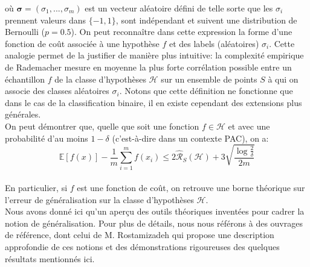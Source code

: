 où $\mathbf{\sigma} = (\sigma_1, ..., \sigma_m)$  est un vecteur aléatoire défini de telle sorte que les $\sigma_i$ prennent valeurs dans $\{-1, 1\}$, sont indépendant et suivent une distribution de Bernoulli ($p=0.5$). On peut reconnaître dans cette expression la forme d'une fonction de coût associée à une hypothèse $f$ et des labels (aléatoires) $\sigma_i$. Cette analogie permet de la justifier de manière plus intuitive: la complexité empirique de Rademacher mesure en moyenne la plus forte corrélation possible entre un échantillon $f$ de la classe d'hypothèses $\mathcal{H}$ sur un ensemble de points $S$ à qui on associe des classes aléatoires $\sigma_i$. Notons que cette définition ne fonctionne que dans le cas de la classification binaire, il en existe cependant des extensions plus générales. \\
On peut démontrer que, quelle que soit une fonction $f \in \mathcal{H}$ et avec une probabilité d'au moins $1-\delta$ (c'est-à-dire dans un contexte PAC), on a:
\begin{equation}
	\mathbb{E}[f(x)] - \frac{1}{m} \sum_{i=1}^{m}f(x_i) \leq 2 \hat{\mathcal{R}}_S(\mathcal{H}) + 3 \sqrt{\frac{\log \frac{2}{\delta}}{2m}}
\end{equation}
\\
En particulier, si $f$ est une fonction de coût, on retrouve une borne théorique sur l'erreur de généralisation sur la classe d'hypothèses $\mathcal{H}$. 
\\
Nous avons donné ici qu'un aperçu des outils théoriques inventées pour cadrer la notion de généralisation. Pour plus de détails, nous nous référons à des ouvrages de référence, dont celui de M. Rostamizadeh \cite{rostamizadehFoundationsMachineLearning2018} qui propose une description approfondie de ces notions et des démonstrations rigoureuses des quelques résultats mentionnés ici.


